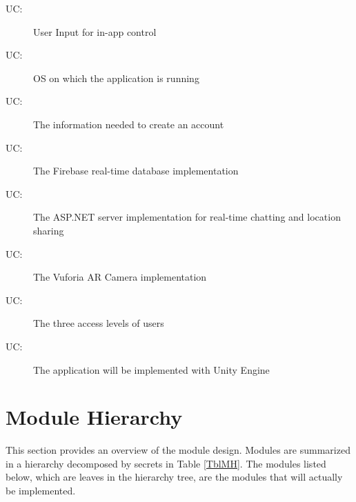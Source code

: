\documentclass[12pt, titlepage]{article}
\newcounter{ucnum}
\newcommand{\uctheucnum}{UC\theucnum}
\begin{document}
\begin{description}
\item[ \uctheucnum \label{ucInput}:]User Input for in-app control
\item[ \uctheucnum \label{ucOS}:]OS on which the application is running
\item[ \uctheucnum \label{ucAccount}:]The information needed to create an account
\item[ \uctheucnum \label{ucDB}:]The Firebase real-time database implementation
\item[ \uctheucnum \label{ucBackend}:]The ASP.NET server implementation for real-time chatting and location sharing
\item[ \uctheucnum \label{ucAR}:]The Vuforia AR Camera implementation
\item[ \uctheucnum \label{ucAccess}:]The three access levels of users
\item[ \uctheucnum \label{ucUnity}:]The application will be implemented with Unity Engine
\end{description}

\section{Module Hierarchy} \label{SecMH}

This section provides an overview of the module design. Modules are summarized
in a hierarchy decomposed by secrets in Table \ref{TblMH}. The modules listed
below, which are leaves in the hierarchy tree, are the modules that will
actually be implemented.
\end{document}
